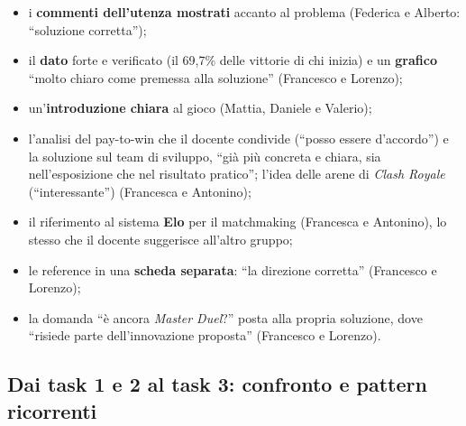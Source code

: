 \begin{itemize}
  \item i \textbf{commenti dell'utenza mostrati} accanto al problema
        (Federica e Alberto: ``soluzione corretta'');
  \item il \textbf{dato} forte e verificato (il 69,7\% delle vittorie di chi
        inizia) e un \textbf{grafico} ``molto chiaro come premessa alla
        soluzione'' (Francesco e Lorenzo);
  \item un'\textbf{introduzione chiara} al gioco (Mattia, Daniele e Valerio);
  \item l'analisi del pay-to-win che il docente condivide (``posso essere
        d'accordo'') e la soluzione sul team di sviluppo, ``già più concreta
        e chiara, sia nell'esposizione che nel risultato pratico''; l'idea
        delle arene di \emph{Clash Royale} (``interessante'') (Francesca e
        Antonino);
  \item il riferimento al sistema \textbf{Elo} per il matchmaking (Francesca
        e Antonino), lo stesso che il docente suggerisce all'altro gruppo;
  \item le reference in una \textbf{scheda separata}: ``la direzione
        corretta'' (Francesco e Lorenzo);
  \item la domanda ``è ancora \emph{Master Duel}?'' posta alla propria
        soluzione, dove ``risiede parte dell'innovazione proposta''
        (Francesco e Lorenzo).
\end{itemize}

\subsection{Dai task 1 e 2 al task 3: confronto e pattern ricorrenti}
\label{rv:t3:sec:confronto}

